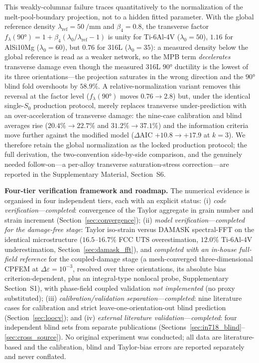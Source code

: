 This weakly-columnar failure traces quantitatively to the normalization of the melt-pool-boundary projection, not to a hidden fitted parameter. With the global reference density $\lambda_{\mathrm{ref}} = \SI{50}{\per\milli\meter}$ and $\beta_4 = 0.8$, the transverse factor $f_\lambda(\ang{90}) = 1 + \beta_4(\lambda_0/\lambda_{\mathrm{ref}}-1)$ is unity for Ti-6Al-4V ($\lambda_0 = 50$), $1.16$ for AlSi10Mg ($\lambda_0 = 60$), but $0.76$ for 316L ($\lambda_0 = 35$): a measured density below the global reference is read as a weaker network, so the MPB term \emph{decelerates} transverse damage even though the measured 316L $\ang{90}$ ductility is the lowest of its three orientations---the projection saturates in the wrong direction and the $\ang{90}$ blind fold overshoots by $58.9\%$. A relative-normalization variant removes this reversal at the factor level ($f_\lambda(\ang{90})$ moves $0.76\to2.8$) but, under the identical single-$S_0$ production protocol, merely replaces transverse under-prediction with an over-acceleration of transverse damage: the nine-case calibration and blind averages rise ($20.4\%\to22.7\%$ and $31.2\%\to37.1\%$) and the information criteria move further against the modified model ($\Delta\mathrm{AIC}$ $+10.8\to+17.9$ at $k=3$). We therefore retain the global normalization as the locked production protocol; the full derivation, the two-convention side-by-side comparison, and the genuinely needed follow-on---a per-alloy transverse saturation-stress correction---are reported in the Supplementary Material, Section~S6.

\textbf{Four-tier verification framework and roadmap.} The numerical evidence is organised in four independent tiers, each with an explicit status: (i) \emph{code verification}---\emph{completed}: convergence of the Taylor aggregate in grain number and strain increment (Section~\ref{sec:convergence}); (ii) \emph{model verification}---\emph{completed for the damage-free stage}: Taylor iso-strain versus DAMASK spectral-FFT on the identical microstructure ($16.5$--$16.7\%$ FCC UTS overestimation, $12.0\%$ Ti-6Al-4V underestimation, Section~\ref{sec:damask_fft}), and \emph{completed with an in-house full-field reference} for the coupled-damage stage (a mesh-converged three-dimensional CPFEM at $\Delta\varepsilon=10^{-3}$, resolved over three orientations, its absolute bias criterion-dependent, plus an integral-type nonlocal probe, Supplementary Section~S1), with phase-field coupled validation \emph{not implemented} (no proxy substituted); (iii) \emph{calibration/validation separation}---\emph{completed}: nine literature cases for calibration and strict leave-one-orientation-out blind prediction (Section~\ref{sec:loocv}); and (iv) \emph{external literature validation}---\emph{completed}: four independent blind sets from separate publications (Sections~\ref{sec:in718_blind}--\ref{sec:cross_source}). No original experiment was conducted; all data are literature-based and the calibration, blind and Taylor-bias errors are reported separately and never conflated.



